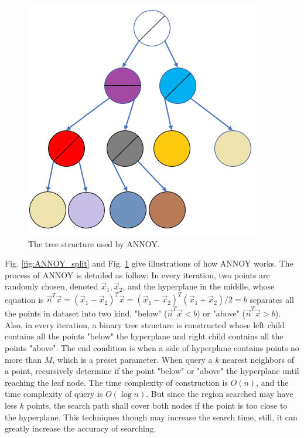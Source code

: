 \documentclass[twocolumn,10pt]{article}
\begin{document}
  \begin{figure}[htb]
    \centering
    \includegraphics[scale=0.5]{assets/ANNOY-tree.png}
    \caption{The tree structure used by ANNOY.}
    \label{fig:ANNOY_tree}
  \end{figure}
  Fig. \ref{fig:ANNOY_split} and Fig. \ref{fig:ANNOY_tree} give illustrations of how ANNOY works. The process of ANNOY is detailed as follow: In every iteration, two points are randomly chosen, denoted $\vec x_1,\vec x_2$, 
  and the hyperplane in the middle, whose equation is $\vec n^T\vec x=(\vec x_1-\vec x_2)^T\vec x=(\vec x_1-\vec x_2)^T(\vec x_1+\vec x_2)/2=b$ 
  separates all the points in dataset into two kind, "below" ($\vec n^T\vec x<b$) or "above" ($\vec n^T\vec x>b$). Also, in every iteration, a 
  binary tree structure is constructed whose left child contains all the points "below" the hyperplane and right child contains all the points "above". 
  The end condition is when a side of hyperplane contains points no more than $M$, which is a preset parameter. 
  When query a $k$ nearest neighbors of a point, recursively determine if the point "below" or "above" the hyperplane until reaching the leaf node. 
  The time complexity of construction is $O(n)$, and the time complexity of query is $O(\log n)$.
  But since the region searched may have less $k$ points, the search path shall cover both nodes if the point is too close to the hyperplane. This 
  techniques though may increase the search time, still, it can greatly increase the accuracy of searching.
\end{document}
